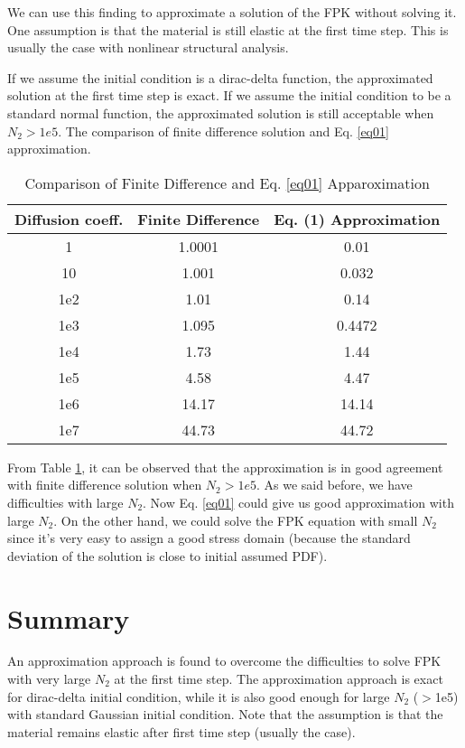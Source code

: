 \documentclass[12pt]{article}
\begin{document}
We can use this finding to approximate a solution of the FPK without solving it. One assumption is that the material is still elastic at the first time step. This is usually the case with nonlinear structural analysis.

If we assume the initial condition is a dirac-delta function, the approximated solution at the first time step is exact. If we assume the initial condition to be a standard normal function, the approximated solution is still acceptable when $N_2>1e5$. The comparison of finite difference solution and Eq. \ref{eq01} approximation.

\begin{table}[]
\centering
\caption{Comparison of Finite Difference and Eq. \ref{eq01} Apparoximation}
\label{my-label}
\begin{tabular}{|c|c|c|}
\hline
Diffusion coeff. & Finite Difference & Eq. (1)  Approximation \\ \hline
1                & 1.0001            & 0.01                   \\ \hline
10               & 1.001             & 0.032                  \\ \hline
1e2              & 1.01              & 0.14                   \\ \hline
1e3             & 1.095             & 0.4472                 \\ \hline
1e4              & {\color{blue} 1.73}              & {\color{blue} 1.44}                   \\ \hline
1e5              & {\color{blue} 4.58}             & {\color{blue} 4.47}                  \\ \hline
1e6              & 14.17             & 14.14                  \\ \hline
1e7              & 44.73             & 44.72                  \\ \hline
\end{tabular}
\end{table}

From Table \ref{my-label}, it can be observed that the approximation is in good agreement with finite difference solution when $N_2>1e5$. As we said before, we have difficulties with large $N_2$. Now Eq. \ref{eq01} could give us good approximation with large $N_2$. On the other hand, we could solve the FPK equation with small $N_2$ since it's very easy to assign a good stress domain (because the standard deviation of the solution is close to initial assumed PDF).


\section{Summary}

An approximation approach is found to overcome the difficulties to solve FPK with very large $N_2$ at the first time step. The approximation approach is exact for dirac-delta initial condition, while it is also good enough for large $N_2$ ($>$1e5) with standard Gaussian initial condition. Note that the assumption is that the material remains elastic after first time step (usually the case).
\end{document}
